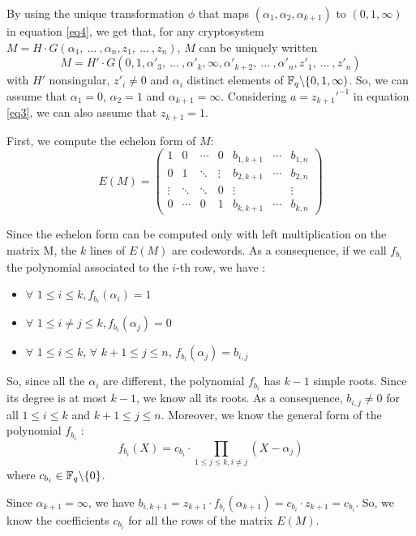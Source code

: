 \documentclass[a4paper]{article}
\begin{document}
By using the unique transformation $\phi$ that maps $(\alpha_1, \alpha_2, \alpha_{k+1})$ to $(0,1,\infty)$ in equation \eqref{eq4}, we get that, for any cryptosystem $M = H\cdot G(\alpha_1, \ ... \ , \alpha_n, z_1, \ ... \ , z_n)$, $M$ can be uniquely written
$$ M = H'\cdot G(0, 1,\alpha'_3, \ ... \ ,\alpha'_k, \infty, \alpha'_{k+2}, \ ... \ , \alpha'_n, z'_1, \ ... \ , z'_n) $$
with $H'$ nonsingular, $z'_i \neq 0$ and $\alpha_i$ distinct elements of $\mathbb{F}_q\backslash\{0, 1, \infty)$.
So, we can assume that $\alpha_1 = 0$, $\alpha_2 = 1$ and $\alpha_{k+1} = \infty$.
Considering $a=z_{k+1}'^{-1}$ in equation \eqref{eq3}, we can also assume that $z_{k+1}=1$.

First, we compute the echelon form of $M$:
$$ E(M) = 
\left(
\begin{array}{ccccccc}
1 & 0 & \cdots & 0 & b_{1,k+1} & \cdots & b_{1,n} \\
0 & 1 & \ddots & \vdots & b_{2,k+1} & \cdots & b_{2,n} \\
\vdots  &  \ddots & \ddots & 0  & \vdots &   & \vdots \\
0 & \cdots & 0 & 1 & b_{k,k+1} & \cdots & b_{k,n}
\end{array}
\right)
$$

Since the echelon form can be computed only with left multiplication on the matrix M, the $k$ lines of $E(M)$ are codewords. As a consequence, if we call $f_{b_i}$ the polynomial associated to the $i$-th
row, we have :
\begin{itemize}
\item $\forall$  $1\leq i\leq k, f_{b_i}(\alpha_i)=1 $
\item $\forall$  $1\leq i\neq j\leq k, f_{b_i}(\alpha_j)=0 $
\item $\forall$  $1\leq i\leq k$, $\forall$ $k+1\leq j\leq n$, $f_{b_i}(\alpha_j)=b_{i,j} $
\end{itemize}

So, since all the $\alpha_i$ are different, the polynomial $f_{b_i}$ has $k-1$ simple roots. Since its degree is at most $k-1$, we know all its roots. As a consequence, $b_{i,j}\neq0$ for all $1\leq i\leq k$ and $k+1\leq j\leq n$. Moreover, we know the general 
form of the polynomial $f_{b_i}$ :
\begin{equation}
f_{b_i}(X) = c_{b_i}\cdot \prod_{1\leq j\leq k, i\neq j} (X-\alpha_j)
\label{eq5}
\end{equation}
where $c_{b_i} \in \mathbb{F}_q\backslash\{0\}$.

Since $\alpha_{k+1} = \infty$, we have $b_{i,k+1} = z_{k+1}\cdot f_{b_i}(\alpha_{k+1}) = c_{b_i}\cdot z_{k+1} = c_{b_i}$.
So, we know the coefficients $c_{b_i}$ for all the rows of the matrix $E(M)$.
\end{document}
